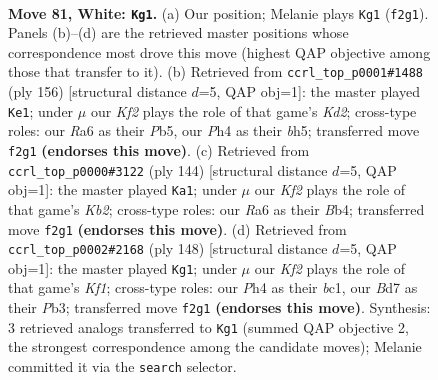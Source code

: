 \documentclass[11pt]{article}
\begin{document}
\clearpage

\begin{figure}[p]\centering
\begin{subfigure}{0.46\textwidth}\centering
\resizebox{\linewidth}{!}{%
\newchessgame
\chessboard[
  setfen={8/3B1P2/R7/2k5/7P/8/5K2/8 w - - 5 81},
  showmover=false,
  pgfstyle=straightmove, color=movearrow, markmove={f2-g1}
]}
\caption{}
\end{subfigure}\hfill
\begin{subfigure}{0.46\textwidth}\centering
\resizebox{\linewidth}{!}{%
\newchessgame
\chessboard[
  setfen={8/8/5p2/1P1k3b/8/8/3K4/6B1 w - - 1 79},
  showmover=false,
  pgfstyle=straightmove, color=movearrow, markmove={d2-e1}
]}
\caption{}
\end{subfigure}
\\[4pt]
\begin{subfigure}{0.46\textwidth}\centering
\resizebox{\linewidth}{!}{%
\newchessgame
\chessboard[
  setfen={4k3/8/6p1/8/1B4b1/6P1/1K6/8 w - - 19 73},
  showmover=false,
  pgfstyle=straightmove, color=movearrow, markmove={b2-a1}
]}
\caption{}
\end{subfigure}\hfill
\begin{subfigure}{0.46\textwidth}\centering
\resizebox{\linewidth}{!}{%
\newchessgame
\chessboard[
  setfen={8/3B4/8/8/1p5k/1P6/8/2b2K2 w - - 12 75},
  showmover=false,
  pgfstyle=straightmove, color=movearrow, markmove={f1-g1}
]}
\caption{}
\end{subfigure}
\caption{\textbf{Move 81, White: \texttt{Kg1}.} (a) Our position; Melanie plays \texttt{Kg1} (\texttt{f2g1}). Panels (b)--(d) are the retrieved master positions whose correspondence most drove this move (highest QAP objective among those that transfer to it). (b) Retrieved from \texttt{ccrl\_top\_p0001\#1488} (ply 156) [structural distance $d$=5, QAP obj=1]: the master played \texttt{Ke1}; under $\mu$ our \emph{Kf2} plays the role of that game's \emph{Kd2}; cross-type roles: our \emph{R}a6 as their \emph{P}b5, our \emph{P}h4 as their \emph{b}h5; transferred move \texttt{f2g1} \textbf{(endorses this move)}. (c) Retrieved from \texttt{ccrl\_top\_p0000\#3122} (ply 144) [structural distance $d$=5, QAP obj=1]: the master played \texttt{Ka1}; under $\mu$ our \emph{Kf2} plays the role of that game's \emph{Kb2}; cross-type roles: our \emph{R}a6 as their \emph{B}b4; transferred move \texttt{f2g1} \textbf{(endorses this move)}. (d) Retrieved from \texttt{ccrl\_top\_p0002\#2168} (ply 148) [structural distance $d$=5, QAP obj=1]: the master played \texttt{Kg1}; under $\mu$ our \emph{Kf2} plays the role of that game's \emph{Kf1}; cross-type roles: our \emph{P}h4 as their \emph{b}c1, our \emph{B}d7 as their \emph{P}b3; transferred move \texttt{f2g1} \textbf{(endorses this move)}. Synthesis: 3 retrieved analogs transferred to \texttt{Kg1} (summed QAP objective 2, the strongest correspondence among the candidate moves); Melanie committed it via the \texttt{search} selector.}
\label{fig:thought-m160}
\end{figure}
\end{document}

